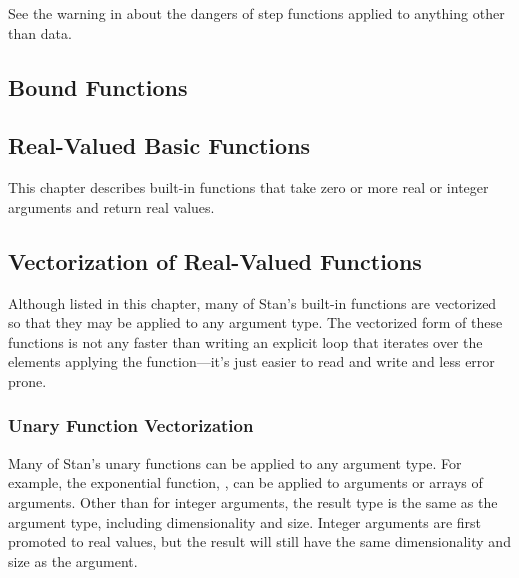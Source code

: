 \begin{description}
\begin{description}
\begin{description}
See the warning in  about the dangers of step functions applied to anything other than data.

\section{Bound Functions}

\begin{description}      %



\chapter{Real-Valued Basic Functions}

This chapter describes built-in functions that take zero or more real or integer arguments and return real values.

\section{Vectorization of Real-Valued Functions}

Although listed in this chapter, many of Stan's built-in functions are vectorized so that they may be applied to any argument type.  The vectorized form of these functions is not any faster than writing an explicit loop that iterates over the elements applying the function---it's just easier to read and write and less error prone.

\subsection{Unary Function Vectorization}

Many of Stan's unary functions can be applied to any argument type. For example, the exponential function, , can be applied to  arguments or arrays of  arguments.  Other than for integer arguments, the result type is the same as the argument type, including dimensionality and size.  Integer arguments are first promoted to real values, but the result will still have the same dimensionality and size as the argument.


\end{description}
\end{description}
\end{description}
\end{description}
